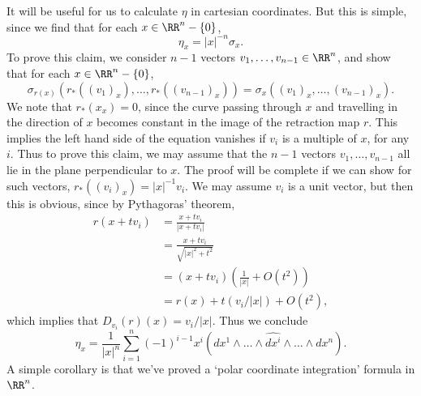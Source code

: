 It will be useful for us to calculate $\eta$ in cartesian coordinates. But this is simple, since we find that for each $x \in \RR^n - \{ 0 \}$,
%
\[ \eta_x = |x|^{-n} \sigma_x. \]
%
To prove this claim, we consider $n-1$ vectors $v_1, \dots, v_{n-1} \in \RR^n$, and show that for each $x \in \RR^n - \{ 0 \}$,
%
\[ \sigma_{r(x)}(r_*((v_1)_x), \dots, r_*((v_{n-1})_x)) = \sigma_x((v_1)_x, \dots, (v_{n-1})_x). \]
%
We note that $r_*(x_x) = 0$, since the curve passing through $x$ and travelling in the direction of $x$ becomes constant in the image of the retraction map $r$. This implies the left hand side of the equation vanishes if $v_i$ is a multiple of $x$, for any $i$. Thus to prove this claim, we may assume that the $n-1$ vectors $v_1, \dots, v_{n-1}$ all lie in the plane perpendicular to $x$. The proof will be complete if we can show for such vectors, $r_*((v_i)_x) = |x|^{-1} v_i$. We may assume $v_i$ is a unit vector, but then this is obvious, since by Pythagoras' theorem,
%
\begin{align*}
    r(x + tv_i) &= \frac{x + tv_i}{|x + tv_i|}\\
    &= \frac{x + tv_i}{\sqrt{|x|^2 + t^2}}\\
    &= (x + tv_i) \left( \frac{1}{|x|} + O(t^2) \right)\\
    &= r(x) + t (v_i/|x|) + O(t^2),
\end{align*}
%
which implies that $D_{v_i}(r)(x) = v_i/|x|$. Thus we conclude
%
\[ \eta_x = \frac{1}{|x|^n} \sum_{i = 1}^n (-1)^{i-1} x^i (dx^1 \wedge \dots \wedge \widehat{dx^i} \wedge \dots \wedge dx^n). \]
%
A simple corollary is that we've proved a `polar coordinate integration' formula in $\RR^n$.

